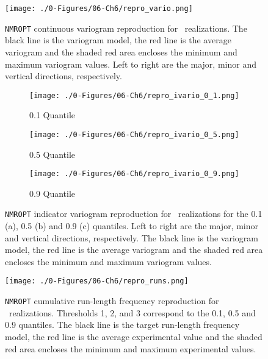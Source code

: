 \begin{figure}[htb!]
    \centering
    \texttt{[image: ./0-Figures/06-Ch6/repro\_vario.png]}
    \caption{\texttt{NMROPT} continuous variogram reproduction for \csnreals \ realizations. The black line is the variogram model, the red line is the average variogram and the shaded red area encloses the minimum and maximum variogram values. Left to right are the major, minor and vertical directions, respectively.}
    \label{fig:nmropt_repro_vario}
\end{figure}

\begin{figure}
    \begin{subfigure}{1.0\textwidth}
        \centering
        \texttt{[image: ./0-Figures/06-Ch6/repro\_ivario\_0\_1.png]}
        \caption{0.1 Quantile}
    \end{subfigure}
    \begin{subfigure}{1.0\textwidth}
        \centering
        \texttt{[image: ./0-Figures/06-Ch6/repro\_ivario\_0\_5.png]}
        \caption{0.5 Quantile}
    \end{subfigure}
    \begin{subfigure}{1.0\textwidth}
        \centering
        \texttt{[image: ./0-Figures/06-Ch6/repro\_ivario\_0\_9.png]}
        \caption{0.9 Quantile}
    \end{subfigure}
    \caption{\texttt{NMROPT} indicator variogram reproduction for \csnreals \ realizations for the 0.1 (a), 0.5 (b) and 0.9 (c) quantiles. Left to right are the major, minor and vertical directions, respectively. The black line is the variogram model, the red line is the average variogram and the shaded red area encloses the minimum and maximum variogram values.}
    \label{fig:nmropt_repro_ivario}
\end{figure}

\begin{figure}[htb!]
    \centering
    \texttt{[image: ./0-Figures/06-Ch6/repro\_runs.png]}
    \caption{\texttt{NMROPT} cumulative run-length frequency reproduction for \csnreals \ realizations. Thresholds 1, 2, and 3 correspond to the 0.1, 0.5 and 0.9 quantiles. The black line is the target run-length frequency model, the red line is the average experimental value and the shaded red area encloses the minimum and maximum experimental values.}
    \label{fig:nmropt_repro_runs}
\end{figure}


